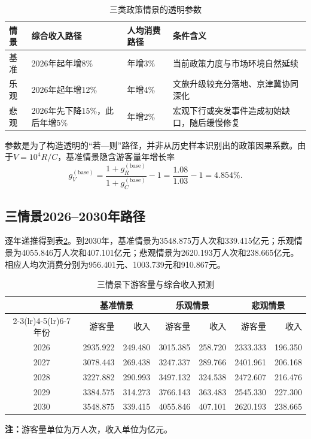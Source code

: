 \documentclass[withoutpreface,bwprint]{cumcmthesis}
\begin{document}
\begin{table}[H]
\centering
\caption{三类政策情景的透明参数}
\label{tab:scenario_assumptions}
\small
\renewcommand{\arraystretch}{1.12}
\begin{tabularx}{\textwidth}{p{2.0cm}p{3.0cm}p{3.2cm}X}
\toprule
情景 & 综合收入路径 & 人均消费路径 & 条件含义 \\
\midrule
基准 & 2026年起年增8\% & 年增3\% & 当前政策力度与市场环境自然延续 \\
乐观 & 2026年起年增12\% & 年增4\% & 文旅升级较充分落地、京津冀协同深化 \\
悲观 & 2026年先下降15\%，此后年增5\% & 年增2\% & 宏观下行或突发事件造成初始缺口，随后缓慢修复 \\
\bottomrule
\end{tabularx}
\end{table}

参数是为了构造透明的“若---则”路径，并非从历史样本识别出的政策因果系数。由于$V=10^4R/C$，基准情景隐含游客量年增长率
\begin{equation}
g_V^{(\mathrm{base})}
=\frac{1+g_R^{(\mathrm{base})}}{1+g_C^{(\mathrm{base})}}-1
=\frac{1.08}{1.03}-1=4.854\%.
\label{eq:baseline_visitor_growth}
\end{equation}

\subsection{三情景2026--2030年路径}

逐年递推得到表\ref{tab:q3_scenario_forecasts}。到2030年，基准情景为3548.875万人次和339.415亿元；乐观情景为4055.846万人次和407.101亿元；悲观情景为2620.193万人次和238.665亿元。相应人均次消费分别为956.401元、1003.739元和910.867元。

\begin{table}[H]
\centering
\caption{三情景下游客量与综合收入预测}
\label{tab:q3_scenario_forecasts}
\scriptsize
\renewcommand{\arraystretch}{1.12}
\begin{tabular}{c rr rr rr}
\toprule
& \multicolumn{2}{c}{基准情景} & \multicolumn{2}{c}{乐观情景} & \multicolumn{2}{c}{悲观情景} \\
\cmidrule(lr){2-3}\cmidrule(lr){4-5}\cmidrule(lr){6-7}
年份 & 游客量 & 收入 & 游客量 & 收入 & 游客量 & 收入 \\
\midrule
2026 & 2935.922 & 249.480 & 3015.385 & 258.720 & 2333.333 & 196.350 \\
2027 & 3078.443 & 269.438 & 3247.337 & 289.766 & 2401.961 & 206.168 \\
2028 & 3227.882 & 290.993 & 3497.132 & 324.538 & 2472.607 & 216.476 \\
2029 & 3384.575 & 314.273 & 3766.143 & 363.483 & 2545.330 & 227.300 \\
2030 & 3548.875 & 339.415 & 4055.846 & 407.101 & 2620.193 & 238.665 \\
\bottomrule
\end{tabular}
\end{table}
\noindent\textbf{注：}游客量单位为万人次，收入单位为亿元。
\end{document}
